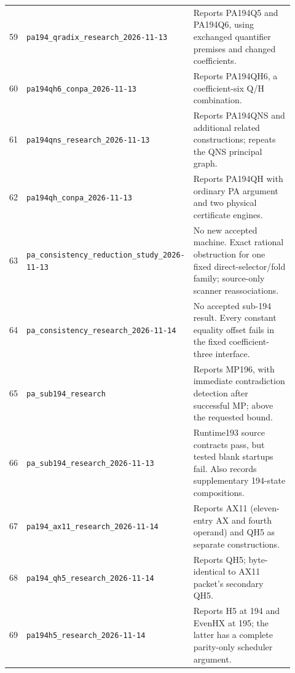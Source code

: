 {\begin{longtable}{@{}r >{\raggedright\arraybackslash}p{0.36\linewidth} >{\raggedright\arraybackslash}p{0.56\linewidth}@{}}
59 & \texttt{pa194\_\allowbreak{}qradix\_\allowbreak{}research\_\allowbreak{}2026-\allowbreak{}11-\allowbreak{}13} & Reports PA194Q5 and PA194Q6, using exchanged quantifier premises and changed coefficients.\\[3pt]
60 & \texttt{pa194qh6\_\allowbreak{}conpa\_\allowbreak{}2026-\allowbreak{}11-\allowbreak{}13} & Reports PA194QH6, a coefficient-six Q/H combination.\\[3pt]
61 & \texttt{pa194qns\_\allowbreak{}research\_\allowbreak{}2026-\allowbreak{}11-\allowbreak{}13} & Reports PA194QNS and additional related constructions; repeats the QNS principal graph.\\[3pt]
62 & \texttt{pa194qh\_\allowbreak{}conpa\_\allowbreak{}2026-\allowbreak{}11-\allowbreak{}13} & Reports PA194QH with ordinary PA argument and two physical certificate engines.\\[3pt]
63 & \texttt{pa\_\allowbreak{}consistency\_\allowbreak{}reduction\_\allowbreak{}study\_\allowbreak{}2026-\allowbreak{}11-\allowbreak{}13} & No new accepted machine. Exact rational obstruction for one fixed direct-selector/fold family; source-only scanner reassociations.\\[3pt]
64 & \texttt{pa\_\allowbreak{}consistency\_\allowbreak{}research\_\allowbreak{}2026-\allowbreak{}11-\allowbreak{}14} & No accepted sub-194 result. Every constant equality offset fails in the fixed coefficient-three interface.\\[3pt]
65 & \texttt{pa\_\allowbreak{}sub194\_\allowbreak{}research} & Reports MP196, with immediate contradiction detection after successful MP; above the requested bound.\\[3pt]
66 & \texttt{pa\_\allowbreak{}sub194\_\allowbreak{}research\_\allowbreak{}2026-\allowbreak{}11-\allowbreak{}13} & Runtime193 source contracts pass, but tested blank startups fail. Also records supplementary 194-state compositions.\\[3pt]
67 & \texttt{pa194\_\allowbreak{}ax11\_\allowbreak{}research\_\allowbreak{}2026-\allowbreak{}11-\allowbreak{}14} & Reports AX11 (eleven-entry AX and fourth operand) and QH5 as separate constructions.\\[3pt]
68 & \texttt{pa194\_\allowbreak{}qh5\_\allowbreak{}research\_\allowbreak{}2026-\allowbreak{}11-\allowbreak{}14} & Reports QH5; byte-identical to AX11 packet's secondary QH5.\\[3pt]
69 & \texttt{pa194h5\_\allowbreak{}research\_\allowbreak{}2026-\allowbreak{}11-\allowbreak{}14} & Reports H5 at 194 and EvenHX at 195; the latter has a complete parity-only scheduler argument.\\[3pt]

\end{longtable}}
